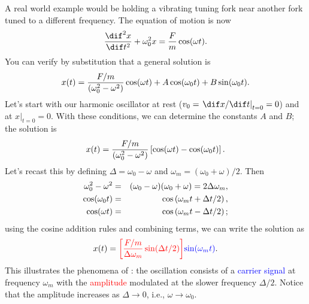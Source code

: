 \begin{sidebar}
 A real world example would be holding a vibrating tuning fork near another fork tuned to a different frequency.  The equation of motion is now
\begin{equation}\label{e.SHO-driven}
	\DDtt{x} + \omega_{0}^{2}x = \frac{F}{m}\cos(\wt).
\end{equation}
You can verify by substitution that a general solution is
\[
	x(t) = \frac{F/m}{(\omega_{0}^{2}-\omega^{2})}\cos(\omega t) + A\cos(\omega_{0} t)+B\sin(\omega_{0} t).
\]
Let's start with our harmonic oscillator at rest ($v_{0} = \left.\dif x/\dif t\right|_{t=0} = 0$) and at $\left. x\right|_{t=0} = 0$.  With these conditions, we can determine the constants $A$ and $B$; the solution is
\[
	x(t) = \frac{F/m}{(\omega_{0}^{2}-\omega^{2})}\left[\cos(\omega t)-\cos(\omega_{0} t)\right].
\]
Let's recast this by defining $\Delta = \omega_{0} - \omega$ and $\omega_{m} = (\omega_{0}+\omega)/2$.  Then
\begin{eqnarray*}
  \omega_{0}^{2}-\omega^{2} &=& (\omega_{0}-\omega)(\omega_{0}+\omega) = 2\Delta\omega_{m},\\
  \cos(\omega_{0} t) &=& \cos\left(\omega_{m} t+\Delta t/2\right),\\
  \cos(\omega t) &=& \cos\left(\omega_{m} t-\Delta t/2\right);
\end{eqnarray*}
using the cosine addition rules and combining terms, we can write the solution as
\begin{equation}\label{e.beats}
	x(t) = {\color{red}\left[\frac{F/m}{\Delta\omega_{m}}\sin(\Delta t/2)\right]}{\color{blue}\sin(\omega_{m} t)}.
\end{equation}
This illustrates the phenomena of : the oscillation consists of a \textcolor{blue}{carrier signal} at frequency $\omega_{m}$ with the \textcolor{red}{amplitude} modulated at the slower frequency $\Delta /2$.  Notice that the amplitude increases as $\Delta \to0$, i.e., $\omega\to\omega_{0}$.


\end{sidebar}
